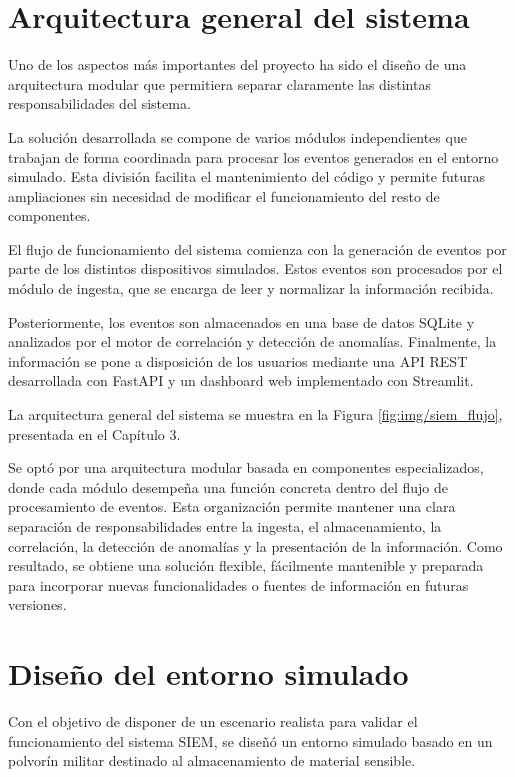 
\section{Arquitectura general del sistema}

Uno de los aspectos más importantes del proyecto ha sido el diseño de una arquitectura modular que permitiera separar claramente las distintas responsabilidades del sistema.

La solución desarrollada se compone de varios módulos independientes que trabajan de forma coordinada para procesar los eventos generados en el entorno simulado. Esta división facilita el mantenimiento del código y permite futuras ampliaciones sin necesidad de modificar el funcionamiento del resto de componentes.

El flujo de funcionamiento del sistema comienza con la generación de eventos por parte de los distintos dispositivos simulados. Estos eventos son procesados por el módulo de ingesta, que se encarga de leer y normalizar la información recibida.

Posteriormente, los eventos son almacenados en una base de datos SQLite y analizados por el motor de correlación y detección de anomalías. Finalmente, la información se pone a disposición de los usuarios mediante una API REST desarrollada con FastAPI y un dashboard web implementado con Streamlit.

La arquitectura general del sistema se muestra en la Figura \ref{fig:img/siem_flujo}, presentada en el Capítulo 3.

Se optó por una arquitectura modular basada en componentes especializados, donde cada módulo desempeña una función concreta dentro del flujo de procesamiento de eventos. Esta organización permite mantener una clara separación de responsabilidades entre la ingesta, el almacenamiento, la correlación, la detección de anomalías y la presentación de la información. Como resultado, se obtiene una solución flexible, fácilmente mantenible y preparada para incorporar nuevas funcionalidades o fuentes de información en futuras versiones.

\section{Diseño del entorno simulado}

Con el objetivo de disponer de un escenario realista para validar el funcionamiento del sistema SIEM, se diseñó un entorno simulado basado en un polvorín militar destinado al almacenamiento de material sensible.

